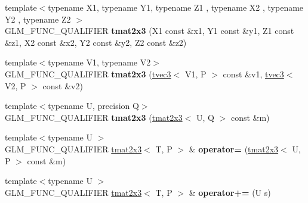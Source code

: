 \begin{DoxyCompactItemize}
\item 
{\footnotesize template$<$typename X1, typename Y1, typename Z1 , typename X2 , typename Y2 , typename Z2 $>$ }\\G\+L\+M\+\_\+\+F\+U\+N\+C\+\_\+\+Q\+U\+A\+L\+I\+F\+I\+ER {\bfseries tmat2x3} (X1 const \&x1, Y1 const \&y1, Z1 const \&z1, X2 const \&x2, Y2 const \&y2, Z2 const \&z2)\hypertarget{structglm_1_1detail_1_1tmat2x3_a4314c8e147d0c2d536781f1743787ab0}{}\label{structglm_1_1detail_1_1tmat2x3_a4314c8e147d0c2d536781f1743787ab0}

\item 
{\footnotesize template$<$typename V1, typename V2$>$ }\\G\+L\+M\+\_\+\+F\+U\+N\+C\+\_\+\+Q\+U\+A\+L\+I\+F\+I\+ER {\bfseries tmat2x3} (\hyperlink{structglm_1_1detail_1_1tvec3}{tvec3}$<$ V1, P $>$ const \&v1, \hyperlink{structglm_1_1detail_1_1tvec3}{tvec3}$<$ V2, P $>$ const \&v2)\hypertarget{structglm_1_1detail_1_1tmat2x3_a883732d6b9178b86a9e5d10483fb6b92}{}\label{structglm_1_1detail_1_1tmat2x3_a883732d6b9178b86a9e5d10483fb6b92}

\item 
{\footnotesize template$<$typename U, precision Q$>$ }\\G\+L\+M\+\_\+\+F\+U\+N\+C\+\_\+\+Q\+U\+A\+L\+I\+F\+I\+ER {\bfseries tmat2x3} (\hyperlink{structglm_1_1detail_1_1tmat2x3}{tmat2x3}$<$ U, Q $>$ const \&m)\hypertarget{structglm_1_1detail_1_1tmat2x3_a16af68f7f9699db992854c79210d8f32}{}\label{structglm_1_1detail_1_1tmat2x3_a16af68f7f9699db992854c79210d8f32}

\item 
{\footnotesize template$<$typename U $>$ }\\G\+L\+M\+\_\+\+F\+U\+N\+C\+\_\+\+Q\+U\+A\+L\+I\+F\+I\+ER \hyperlink{structglm_1_1detail_1_1tmat2x3}{tmat2x3}$<$ T, P $>$ \& {\bfseries operator=} (\hyperlink{structglm_1_1detail_1_1tmat2x3}{tmat2x3}$<$ U, P $>$ const \&m)\hypertarget{structglm_1_1detail_1_1tmat2x3_a1c28fce0a5ae7b18120851f7a44f9448}{}\label{structglm_1_1detail_1_1tmat2x3_a1c28fce0a5ae7b18120851f7a44f9448}

\item 
{\footnotesize template$<$typename U $>$ }\\G\+L\+M\+\_\+\+F\+U\+N\+C\+\_\+\+Q\+U\+A\+L\+I\+F\+I\+ER \hyperlink{structglm_1_1detail_1_1tmat2x3}{tmat2x3}$<$ T, P $>$ \& {\bfseries operator+=} (U s)\hypertarget{structglm_1_1detail_1_1tmat2x3_a4cc0ac05c7c7c0ca0922739828ea087e}{}\label{structglm_1_1detail_1_1tmat2x3_a4cc0ac05c7c7c0ca0922739828ea087e}


\end{DoxyCompactItemize}
